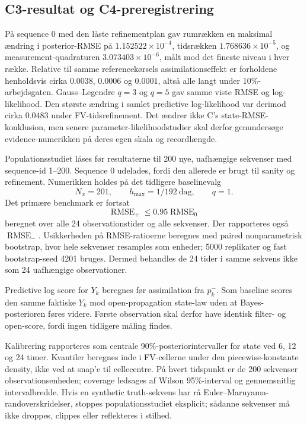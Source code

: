 \subsection{C3-resultat og C4-preregistrering}
På sequence 0 med den låste refinementplan gav rumrækken en maksimal ændring i
posterior-RMSE på \(1.152522\times10^{-4}\), tidsrækken
\(1.768636\times10^{-5}\), og measurement-quadraturen
\(3.073403\times10^{-6}\), målt mod det fineste niveau i hver række. Relative
til samme referencekørsels assimilationseffekt er forholdene henholdsvis cirka
\(0.0038\), \(0.0006\) og \(0.0001\), altså alle langt under 10\%-arbejdsgaten.
Gauss--Legendre \(q=3\) og \(q=5\) gav samme viste RMSE og log-likelihood.
Den største ændring i samlet predictive log-likelihood var derimod cirka
\(0.0483\) under FV-tidsrefinement. Det ændrer ikke C's state-RMSE-konklusion,
men senere parameter-likelihoodstudier skal derfor genundersøge evidence-numerikken
på deres egen skala og recordlængde.

Populationsstudiet låses før resultaterne til 200 nye, uafhængige sekvenser med
sequence-id 1--200. Sequence 0 udelades, fordi den allerede er brugt til sanity og
refinement. Numerikken holdes på det tidligere baselinevalg
\[
 N_x=201,\qquad h_{\max}=1/192\ \text{dag},\qquad q=1.
\]
Det primære benchmark er fortsat
\[
 \operatorname{RMSE}_+\leq0.95\operatorname{RMSE}_0
\]
beregnet over alle 24 observationstider og alle sekvenser. Der rapporteres også
\(\operatorname{RMSE}_-\). Usikkerheden på RMSE-ratioerne beregnes med paired
nonparametrisk bootstrap, hvor hele sekvenser resamples som enheder; 5000
replikater og fast bootstrap-seed 4201 bruges. Dermed behandles de 24 tider i
samme sekvens ikke som 24 uafhængige observationer.

Predictive log score for \(Y_k\) beregnes før assimilation fra \(p_k^-\). Som
baseline scores den samme faktiske \(Y_k\) mod open-propagation state-law uden at
Bayes-posterioren føres videre. Første observation skal derfor have identisk
filter- og open-score, fordi ingen tidligere måling findes.

Kalibrering rapporteres som centrale 90\%-posteriorintervaller for state ved
6, 12 og 24 timer. Kvantiler beregnes inde i FV-cellerne under den
piecewise-konstante density, ikke ved at snap'e til cellecentre. På hvert tidspunkt
er de 200 sekvenser observationsenheden; coverage ledsages af Wilson 95\%-interval
og gennemsnitlig intervalbredde. Hvis en synthetic truth-sekvens har rå
Euler--Maruyama-randoverskridelser, stoppes populationsstudiet eksplicit; sådanne
sekvenser må ikke droppes, clippes eller reflekteres i stilhed.

